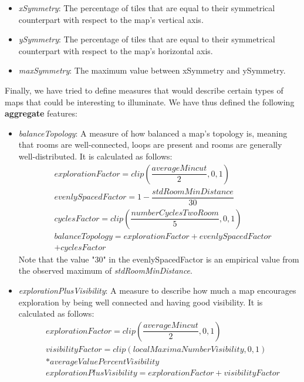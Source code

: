 \documentclass{Configuration_Files/PoliMi3i_thesis}
\begin{document}
\begin{itemize}
    \item \textit{xSymmetry}: The percentage of tiles that are equal to their symmetrical counterpart with respect to the map's vertical axis.
    \item \textit{ySymmetry}: The percentage of tiles that are equal to their symmetrical counterpart with respect to the map's horizontal axis.
    \item \textit{maxSymmetry}: The maximum value between xSymmetry and ySymmetry.
\end{itemize}

Finally, we have tried to define measures that would describe certain types of maps that could be interesting to illuminate. We have thus defined the following \textbf{aggregate} features:

\begin{itemize}
    \item \textit{balanceTopology}: A measure of how balanced a map's topology is, meaning that rooms are well-connected, loops are present and rooms are generally well-distributed. It is calculated as follows:
    \begin{equation}
    \begin{split}
        &explorationFactor = clip\left(\dfrac{averageMincut}{2}, 0, 1\right) \\
        &evenlySpacedFactor = 1 - \dfrac{stdRoomMinDistance}{30} \\
        &cyclesFactor = clip\left(\dfrac{numberCyclesTwoRoom}{5}, 0, 1\right) \\
        &balanceTopology = explorationFactor + evenlySpacedFactor \\
        &+ cyclesFactor
    \end{split}
    \end{equation}
    Note that the value "30" in the evenlySpacedFactor is an empirical value from the observed maximum of \textit{stdRoomMinDistance}.
    \item \textit{explorationPlusVisibility}: A measure to describe how much a map encourages exploration by being well connected and having good visibility. It is calculated as follows:
    \begin{equation}
    \begin{split}
        &explorationFactor = clip\left(\dfrac{averageMincut}{2}, 0, 1\right) \\
        &visibilityFactor = clip\left(localMaximaNumberVisibility, 0, 1\right)\\ 
        &* averageValuePercentVisibility \\
        &explorationPlusVisibility = explorationFactor + visibilityFactor
    \end{split}
    \end{equation}
\end{itemize}
\end{document}
